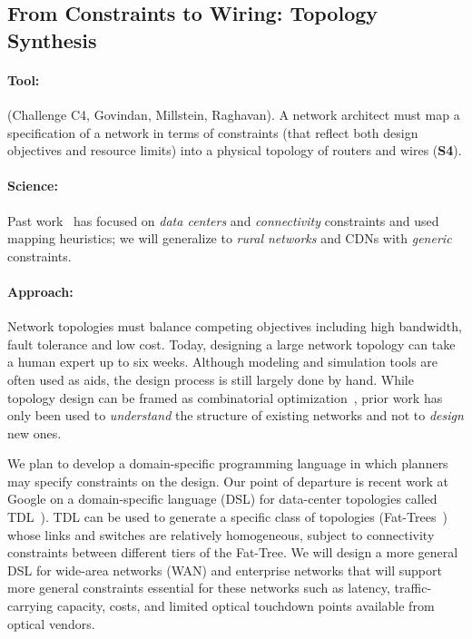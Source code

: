 \subsection{From Constraints to Wiring: Topology Synthesis}

\paragraph*{Tool:} (Challenge C4, Govindan, Millstein, Raghavan). A network
architect must map a specification of a network in terms of
constraints (that reflect both design objectives and resource limits)
into a physical topology of routers and wires ({\bf S4}).
%
\paragraph*{Science:} Past work~\cite{condor} has focused on {\em data
  centers} and {\em connectivity} constraints and used mapping
heuristics; we will generalize to {\em rural networks} and CDNs with {\em
  generic} constraints.



\paragraph*{Approach:}
%
Network topologies must balance competing objectives including high
bandwidth, fault tolerance and low cost. Today, designing a large
network topology can take a human expert up to six weeks. Although
modeling and simulation tools are often used as aids, the design
process is still largely done by hand.  While topology design can be
framed as combinatorial optimization~\cite{PA,
  Hongsuda,HOT}, prior work has only been used to {\em understand}
the structure of existing networks and not to {\em design} new ones.

We plan to develop a domain-specific programming language in which
planners may specify constraints on the design.  Our point of
departure is recent work at Google on a domain-specific language (DSL)
for data-center topologies called TDL~\cite{condor}). TDL can be used
to generate a specific class of topologies (Fat-Trees~\cite{FatTree})
whose links and switches are relatively homogeneous, subject to
connectivity constraints between different tiers of the Fat-Tree. We
will design a more general DSL for wide-area networks (WAN) and
enterprise networks that will support more general constraints
essential for these networks such as latency, traffic-carrying
capacity, costs, and limited optical touchdown points available from
optical vendors.

